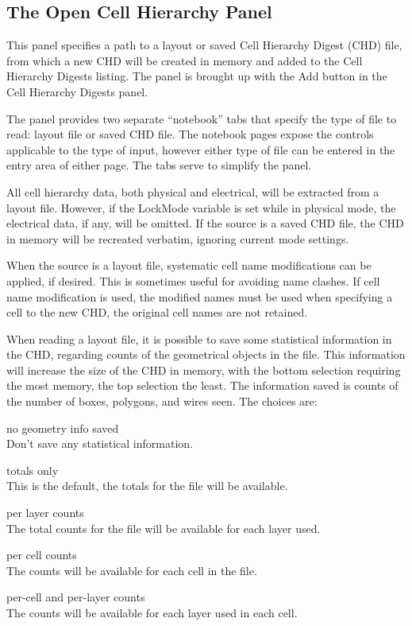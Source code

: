 \subsection{The {\cb Open Cell Hierarchy} Panel}
\label{chdadd}

This panel specifies a path to a layout or saved Cell Hierarchy Digest
(CHD) file, from which a new CHD will be created in memory and added
to the {\cb Cell Hierarchy Digests} listing.  The panel is brought up
with the {\cb Add} button in the {\cb Cell Hierarchy Digests} panel.

The panel provides two separate ``notebook'' tabs that specify the
type of file to read: layout file or saved CHD file.  The notebook
pages expose the controls applicable to the type of input, however
either type of file can be entered in the entry area of either page.
The tabs serve to simplify the panel.

All cell hierarchy data, both physical and electrical, will be
extracted from a layout file.  However, if the {\cb LockMode} variable
is set while in physical mode, the electrical data, if any, will be
omitted.  If the source is a saved CHD file, the CHD in memory will be
recreated verbatim, ignoring current mode settings.

When the source is a layout file, systematic cell name modifications
can be applied, if desired.  This is sometimes useful for avoiding
name clashes.  If cell name modification is used, the modified names
must be used when specifying a cell to the new CHD, the original cell
names are not retained.

When reading a layout file, it is possible to save some statistical
information in the CHD, regarding counts of the geometrical objects in
the file.  This information will increase the size of the CHD in
memory, with the bottom selection requiring the most memory, the top
selection the least.  The information saved is counts of the number of
boxes, polygons, and wires seen.  The choices are:

\begin{description}
\item{\cb no geometry info saved}\\
Don't save any statistical information.

\item{\cb totals only}\\
This is the default, the totals for the file will be available.

\item{\cb per layer counts}\\
The total counts for the file will be available for each layer used.

\item{\cb per cell counts}\\
The counts will be available for each cell in the file.

\item{per-cell and per-layer counts}\\
The counts will be available for each layer used in each cell.
\end{description}


